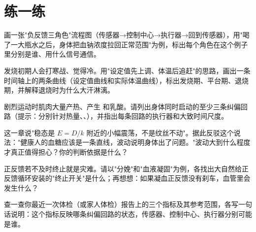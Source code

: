 \section*{练一练}

\begin{sikaoti}
\item 画一张"负反馈三角色"流程图（传感器→控制中心→执行器→回到传感器），用"喝了一大瓶水之后，身体把血钠浓度拉回正常范围"为例，标出每个角色在这个例子里分别是谁、用什么信号通信。
\item 发烧初期人会打寒战、觉得冷。用"设定值先上调、体温后追赶"的思路，画出一条时间轴上的两条曲线（设定值曲线和实际体温曲线），标出发烧期、平台期、退烧期，并解释退烧时为什么大汗淋漓。
\item 剧烈运动时肌肉大量产热、产生  和乳酸。请列出身体同时启动的至少三条纠偏回路（提示：分别针对热量、、），并指出每条回路的执行器和大致时间尺度。
\item 这一章说"稳态是 $E=D/k$ 附近的小幅震荡，不是纹丝不动"。据此反驳这个说法："健康人的血糖应该是一条直线，波动说明身体出了问题。"波动大到什么程度才真正值得担心？你的判断依据是什么？
\item 正反馈若不及时终止就是灾难。请以"分娩"和"血液凝固"为例，各找出大自然给正反馈循环安装的"终止开关"是什么；再想想：如果凝血正反馈没有刹车，血管里会发生什么？
\item 查一查你最近一次体检（或家人体检）报告上的三个指标及其参考范围，各写一句话说明：这个指标反映哪条纠偏回路的状态，传感器、控制中心、执行器分别可能是谁。
\end{sikaoti}
